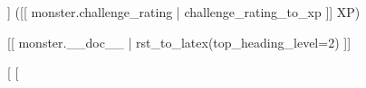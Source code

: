 {    \begin{description}
    [%
    \item [Senses:] [%
    \item [Languages:] [%
    [%
    [%
    [%
    [%
    [%
    \item [Challenge:] [[ monster.challenge_rating ]] ([[ monster.challenge_rating | challenge_rating_to_xp ]] XP)
    \end{description}

    \vspace{0.2cm}
    
    [[ monster.__doc__ | rst_to_latex(top_heading_level=2) ]]

    } %
  [%
[%
